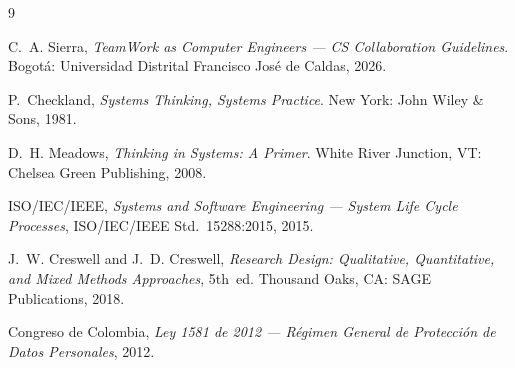 \documentclass[12pt, onecolumn]{IEEEtran}
\begin{document}
\begin{thebibliography}{9}

C.~A. Sierra,
\textit{TeamWork as Computer Engineers --- CS Collaboration Guidelines}.
Bogot\'{a}: Universidad Distrital Francisco Jos\'{e} de Caldas, 2026.

P.~Checkland,
\textit{Systems Thinking, Systems Practice}.
New York: John Wiley \& Sons, 1981.

D.~H. Meadows,
\textit{Thinking in Systems: A Primer}.
White River Junction, VT: Chelsea Green Publishing, 2008.

ISO/IEC/IEEE,
\textit{Systems and Software Engineering --- System Life Cycle Processes},
ISO/IEC/IEEE Std.~15288:2015, 2015.

J.~W. Creswell and J.~D. Creswell,
\textit{Research Design: Qualitative, Quantitative, and Mixed Methods
Approaches}, 5th~ed.
Thousand Oaks, CA: SAGE Publications, 2018.

Congreso de Colombia,
\textit{Ley 1581 de 2012 --- R\'{e}gimen General de Protecci\'{o}n
de Datos Personales}, 2012.

\end{thebibliography}
\end{document}
